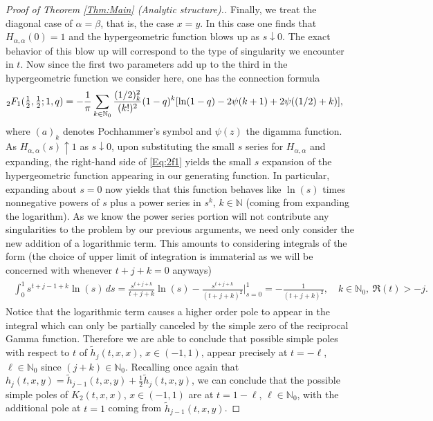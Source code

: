\documentclass[letterpaper,10pt]{amsart}
\numberwithin{equation}{section}
\begin{document}
\begin{proof}[Proof of Theorem \ref{Thm:Main} (Analytic structure).]
Finally, we treat the diagonal case of $\alpha=\beta$, that is, the case $x=y$. In this case one finds that $H_{\alpha,\alpha}(0)=1$ and the hypergeometric function blows up as $s\downarrow0$. The exact behavior of this blow up will correspond to the type of singularity we encounter in $t$. Now since the first two parameters add up to the third in the hypergeometric function we consider here, one has the connection formula \cite[Eq. 15.8.10]{DLMF}
\begin{align}\label{Eq:2f1}
\mathstrut_2 F_1(\tfrac{1}{2},\tfrac{1}{2};1,q)&=-\frac{1}{\pi}\sum_{k\in\mathbb{N}_0} \frac{(1/2)_k^2}{(k!)^2}(1-q)^k[\ln(1-q)-2\psi(k+1)+2\psi((1/2)+k)],
\end{align}
where $(a)_k$ denotes Pochhammer's symbol and $\psi(z)$ the digamma function. As $H_{\alpha,\alpha}(s)\uparrow1$ as $s\downarrow0$, upon substituting the small $s$ series for $H_{\alpha,\alpha}$ and expanding, the right-hand side of \eqref{Eq:2f1} yields the small $s$ expansion of the hypergeometric function appearing in our generating function. In particular, expanding about $s=0$ now yields that this function behaves like $\ln(s)$ times nonnegative powers of $s$ plus a power series in $s^k$, $k\in\mathbb{N}$ (coming from expanding the logarithm). As we know the power series portion will not contribute any singularities to the problem by our previous arguments, we need only consider the new addition of a logarithmic term. This amounts to considering integrals of the form (the choice of upper limit of integration is immaterial as we will be concerned with whenever $t+j+k=0$ anyways)
\begin{align}\label{Eq:logpole}
\begin{split}
\int_0^1 s^{t+j-1+k}\ln(s)\, ds=\frac{s^{t+j+k}}{t+j+k}\ln(s)-\frac{s^{t+j+k}}{(t+j+k)^2}\bigg|_{s=0}^1=-\frac{1}{(t+j+k)^2},\quad k\in\mathbb{N}_0,\ \Re(t)>-j.
\end{split}
\end{align}
Notice that the logarithmic term causes a higher order pole to appear in the integral which can only be partially canceled by the simple zero of the reciprocal Gamma function. Therefore we are able to conclude that possible simple poles with respect to $t$ of $\widetilde{h}_j(t,x,x)$, $x\in(-1,1)$, appear precisely at $t=-\ell$, $\ell\in\mathbb{N}_0$ since $(j+k)\in\mathbb{N}_0$.
Recalling once again that $h_j(t,x,y)=\widetilde{h}_{j-1}(t,x,y)+\tfrac{1}{2}\widetilde{h}_j(t,x,y)$, we can conclude that the possible simple poles of $K_2(t,x,x)$, $x\in(-1,1)$ are at $t=1-\ell$, $\ell\in\mathbb{N}_0$, with the additional pole at $t=1$ coming from $\widetilde{h}_{j-1}(t,x,y)$.
\end{proof}
\end{document}
